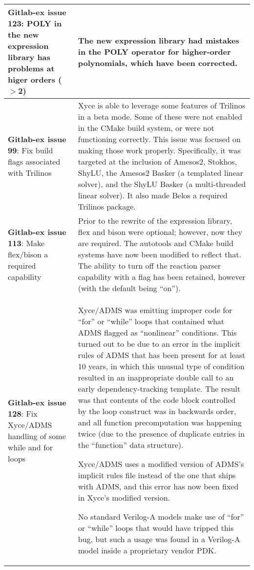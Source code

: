 {\begin{longtable}[h] {>{\raggedright\small}m{2in}|>{\raggedright\let\\\tabularnewline\small}m{3.5in}}
\textbf{Gitlab-ex issue 123}:  POLY in the new expression library has problems 
  at higer orders ($>$2) & The new expression library had mistakes in the POLY 
  operator for higher-order polynomials, which have been corrected.  
\\ \hline

\textbf{Gitlab-ex issue 99}:  Fix build flags associated with Trilinos &
Xyce is able to leverage some features of Trilinos in a beta mode. Some of
these were not enabled in the CMake build system, or were not functioning
correctly. This issue was focused on making those work properly. Specifically,
it was targeted at the inclusion of Amesos2, Stokhos, ShyLU, the Amesos2 Basker
(a templated linear solver), and the ShyLU Basker (a multi-threaded linear
solver). It also made Belos a required Trilinos package.
\\ \hline

\textbf{Gitlab-ex issue 113}:  Make flex/bison a required capability &
Prior to the rewrite of the expression library, flex and bison were optional;
however, now they are required. The autotools and CMake build systems have now
been modified to reflect that. The ability to turn off the reaction parser
capability with a flag has been retained, however (with the default being
``on'').
\\ \hline

\textbf{Gitlab-ex issue 128}: Fix Xyce/ADMS handling of some while and for loops &
Xyce/ADMS was emitting improper code for ``for'' or ``while'' loops
that contained what ADMS flagged as ``nonlinear'' conditions.  This
turned out to be due to an error in the implicit rules of ADMS that
has been present for at least 10 years, in which this unusual type of
condition resulted in an inappropriate double call to an early
dependency-tracking template.  The result was that contents of the
code block controlled by the loop construct was in backwards order,
and all function precomputation was happening twice (due to the
presence of duplicate entries in the ``function'' data structure).

Xyce/ADMS uses a modified version of ADMS's implicit rules file
instead of the one that ships with ADMS, and this error has now been
fixed in Xyce's modified version.

No standard Verilog-A models make use of ``for'' or ``while'' loops
that would have tripped this bug, but such a usage was found in a
Verilog-A model inside a proprietary vendor PDK. \\ \hline


\end{longtable}}
